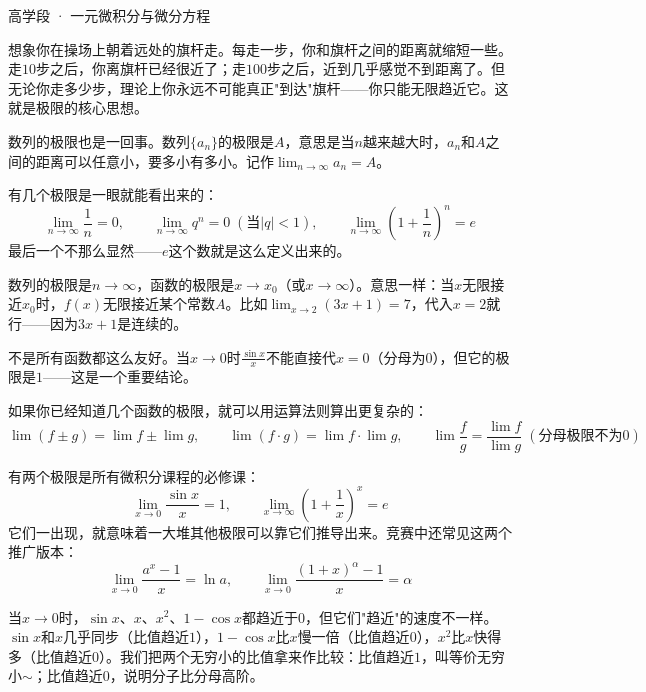 \documentclass[a4paper,12pt]{ctexart}
\begin{document}
\pagestyle{empty}

\begin{center}
  \large 高学段 · 一元微积分与微分方程
\end{center}
\vspace{0.3cm}



想象你在操场上朝着远处的旗杆走。每走一步，你和旗杆之间的距离就缩短一些。走$10$步之后，你离旗杆已经很近了；走$100$步之后，近到几乎感觉不到距离了。但无论你走多少步，理论上你永远不可能真正"到达"旗杆——你只能无限趋近它。这就是极限的核心思想。

数列的极限也是一回事。数列$\{a_n\}$的极限是$A$，意思是当$n$越来越大时，$a_n$和$A$之间的距离可以任意小，要多小有多小。记作$\lim_{n\to\infty}a_n=A$。

有几个极限是一眼就能看出来的：
\[
\lim_{n\to\infty}\frac1n = 0,\qquad
\lim_{n\to\infty}q^n = 0\;(\text{当}|q|<1),\qquad
\lim_{n\to\infty}\left(1+\frac1n\right)^n = e
\]
最后一个不那么显然——$e$这个数就是这么定义出来的。


数列的极限是$n\to\infty$，函数的极限是$x\to x_0$（或$x\to\infty$）。意思一样：当$x$无限接近$x_0$时，$f(x)$无限接近某个常数$A$。比如$\lim_{x\to2}(3x+1)=7$，代入$x=2$就行——因为$3x+1$是连续的。

不是所有函数都这么友好。当$x\to0$时$\frac{\sin x}{x}$不能直接代$x=0$（分母为$0$），但它的极限是$1$——这是一个重要结论。


如果你已经知道几个函数的极限，就可以用运算法则算出更复杂的：
\[
\lim(f\pm g)=\lim f\pm\lim g,\qquad
\lim(f\cdot g)=\lim f\cdot\lim g,\qquad
\lim\frac{f}{g}=\frac{\lim f}{\lim g}\;(\text{分母极限不为$0$})
\]


有两个极限是所有微积分课程的必修课：
\[
\lim_{x\to0}\frac{\sin x}{x}=1,\qquad
\lim_{x\to\infty}\left(1+\frac1x\right)^x=e
\]
它们一出现，就意味着一大堆其他极限可以靠它们推导出来。竞赛中还常见这两个推广版本：
\[
\lim_{x\to0}\frac{a^x-1}{x}=\ln a,\qquad
\lim_{x\to0}\frac{(1+x)^\alpha-1}{x}=\alpha
\]


当$x\to0$时，$\sin x$、$x$、$x^2$、$1-\cos x$都趋近于$0$，但它们"趋近"的速度不一样。$\sin x$和$x$几乎同步（比值趋近$1$），$1-\cos x$比$x$慢一倍（比值趋近$0$），$x^2$比$x$快得多（比值趋近$0$）。我们把两个无穷小的比值拿来作比较：比值趋近$1$，叫等价无穷小$\sim$；比值趋近$0$，说明分子比分母高阶。
\end{document}
